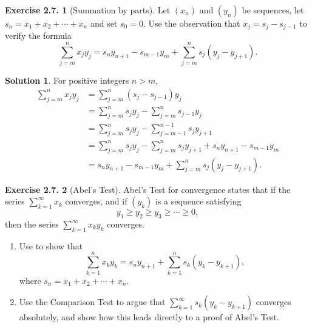 \documentclass[12pt]{article}
\theoremstyle{definition}
\theoremstyle{exercise}
\newtheorem{exercise}{Exercise 2.7.}
\theoremstyle{solution}
\newtheorem*{solution}{Solution}
\begin{document}
\begin{exercise}[Summation by parts]
\label{ex:12}
    Let \( (x_n) \) and \( (y_n) \) be sequences, let \( s_n = x_1 + x_2 + \cdots + x_n \) and set \( s_0 = 0 \). Use the observation that \( x_j = s_j - s_{j-1} \) to verify the formula
    \[
        \sum_{j=m}^n x_j y_j = s_n y_{n+1} - s_{m-1} y_m + \sum_{j=m}^n s_j (y_j - y_{j+1}).
    \]
\end{exercise}

\begin{solution}
    For positive integers \( n > m \),
    \begin{align*}
        \sum_{j=m}^n x_j y_j &= \sum_{j=m}^n (s_j - s_{j-1}) y_j \\
        &= \sum_{j=m}^n s_j y_j - \sum_{j=m}^n s_{j-1} y_j \\
        &= \sum_{j=m}^n s_j y_j - \sum_{j=m-1}^{n-1} s_j y_{j+1} \\
        &= \sum_{j=m}^n s_j y_j - \sum_{j=m}^n s_j y_{j+1} + s_n y_{n+1} - s_{m-1} y_m \\
        &= s_n y_{n+1} - s_{m-1} y_m + \sum_{j=m}^n s_j (y_j - y_{j+1}).
    \end{align*}
\end{solution}

\begin{exercise}[Abel's Test]
\label{ex:13}
    Abel's Test for convergence states that if the series \( \sum_{k=1}^{\infty} x_k \) converges, and if \( (y_k) \) is a sequence satisfying
    \[
        y_1 \geq y_2 \geq y_3 \geq \cdots \geq 0,
    \]
    then the series \( \sum_{k=1}^{\infty} x_k y_k \) converges.
    \begin{enumerate}
        \item Use  to show that
        \[
            \sum_{k=1}^n x_k y_k = s_n y_{n+1} + \sum_{k=1}^n s_k (y_k - y_{k+1}),
        \]
        where \( s_n = x_1 + x_2 + \cdots + x_n \).

        \item Use the Comparison Test to argue that \( \sum_{k=1}^{\infty} s_k (y_k - y_{k+1}) \) converges absolutely, and show how this leads directly to a proof of Abel's Test.
    \end{enumerate}
\end{exercise}
\end{document}
